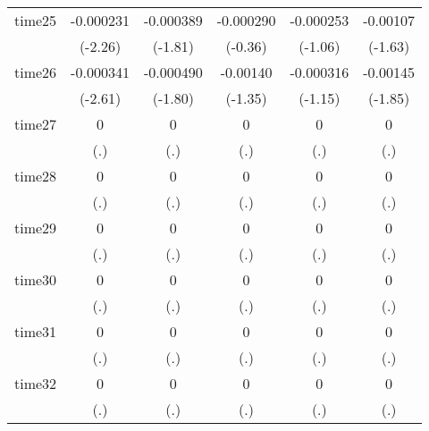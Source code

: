 \begin{table}[htbp]
\begin{tabular}{l*{5}{c}}
time25      &   -0.000231\sym{*}  &   -0.000389         &   -0.000290         &   -0.000253         &    -0.00107         \\
            &     (-2.26)         &     (-1.81)         &     (-0.36)         &     (-1.06)         &     (-1.63)         \\
time26      &   -0.000341\sym{**} &   -0.000490         &    -0.00140         &   -0.000316         &    -0.00145         \\
            &     (-2.61)         &     (-1.80)         &     (-1.35)         &     (-1.15)         &     (-1.85)         \\
time27      &           0         &           0         &           0         &           0         &           0         \\
            &         (.)         &         (.)         &         (.)         &         (.)         &         (.)         \\
time28      &           0         &           0         &           0         &           0         &           0         \\
            &         (.)         &         (.)         &         (.)         &         (.)         &         (.)         \\
time29      &           0         &           0         &           0         &           0         &           0         \\
            &         (.)         &         (.)         &         (.)         &         (.)         &         (.)         \\
time30      &           0         &           0         &           0         &           0         &           0         \\
            &         (.)         &         (.)         &         (.)         &         (.)         &         (.)         \\
time31      &           0         &           0         &           0         &           0         &           0         \\
            &         (.)         &         (.)         &         (.)         &         (.)         &         (.)         \\
time32      &           0         &           0         &           0         &           0         &           0         \\
            &         (.)         &         (.)         &         (.)         &         (.)         &         (.)         \\

\end{tabular}
\end{table}
